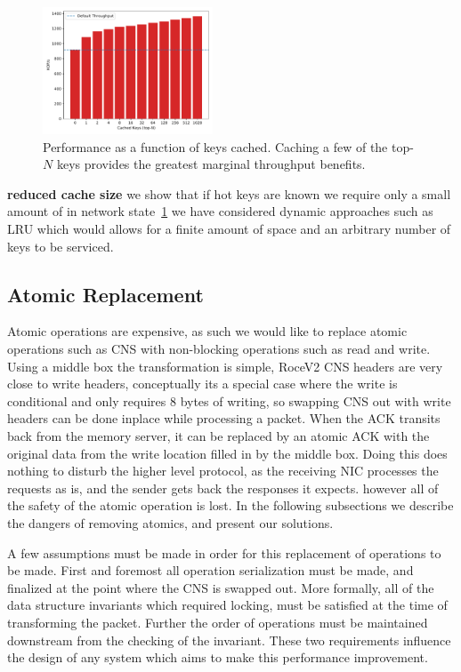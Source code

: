 \begin{figure}
    \includegraphics[width=0.45\textwidth]{fig/cache.pdf}
    \caption{Performance as a function of keys cached. Caching a few
    of the top-$N$ keys provides the greatest marginal throughput
    benefits.}
    \label{fig:cache}
\end{figure}

\textbf{reduced cache size} we show that if hot keys are known we require only a
small amount of in network state~\ref{fig:cache} we have considered dynamic
approaches such as LRU which would allows for a finite amount of space and an
arbitrary number of keys to be serviced.

\subsection{Atomic Replacement} Atomic operations are expensive, as such we
would like to replace atomic operations such as CNS with non-blocking operations
such as read and write. Using a middle box the transformation is simple, RoceV2
CNS headers are very close to write headers, conceptually its a special case
where the write is conditional and only requires 8 bytes of writing, so swapping
CNS out with write headers can be done inplace while processing a packet. When
the ACK transits back from the memory server, it can be replaced by an atomic
ACK with the original data from the write location filled in by the middle box.
Doing this does nothing to disturb the higher level protocol, as the receiving
NIC processes the requests as is, and the sender gets back the responses it
expects. however all of the safety of the atomic operation is lost.  In the
following subsections we describe the dangers of removing atomics, and present
our solutions.

A few assumptions must be made in order for this replacement of operations to be
made. First and foremost all operation serialization must be made, and finalized
at the point where the CNS is swapped out. More formally, all of the data
structure invariants which required locking, must be satisfied at the time of
transforming the packet. Further the order of operations must be maintained
downstream from the checking of the invariant. These two requirements influence
the design of any system which aims to make this performance improvement. 

